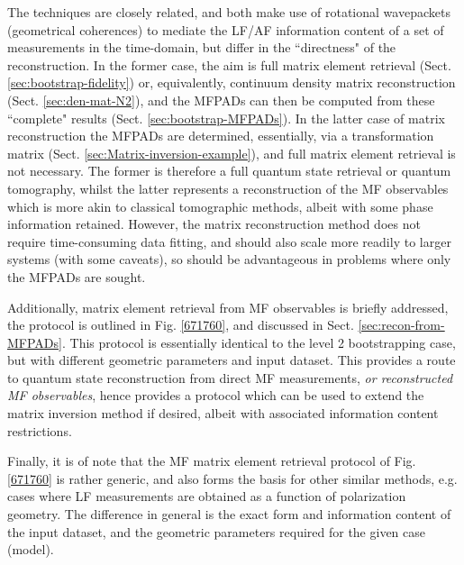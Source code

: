 \documentclass[10pt]{article}
\begin{document}
The techniques are closely related, and both make use of rotational wavepackets (geometrical coherences) to mediate the LF/AF information content of a set of measurements in the time-domain, but differ in the ``directness" of the reconstruction. In the former case, the aim is full matrix element retrieval (Sect. \ref{sec:bootstrap-fidelity}) or, equivalently, continuum density matrix reconstruction (Sect. \ref{sec:den-mat-N2}), and the MFPADs can then be computed from these ``complete" results (Sect. \ref{sec:bootstrap-MFPADs}). In the latter case of matrix reconstruction the MFPADs are determined, essentially, via a transformation matrix (Sect. \ref{sec:Matrix-inversion-example}), and full matrix element retrieval is not necessary. The former is therefore a full quantum state retrieval or quantum tomography, whilst the latter represents a reconstruction of the MF observables which is more akin to classical tomographic methods, albeit with some phase information retained. %
However, the matrix reconstruction method does not require time-consuming data fitting, and should also scale more readily to larger systems (with some caveats), so should be advantageous in problems where only the MFPADs are sought.

Additionally, matrix element retrieval from MF observables is briefly addressed, the protocol is outlined in Fig. \ref{671760}, and discussed in Sect. \ref{sec:recon-from-MFPADs}. This protocol is essentially identical to the level 2 bootstrapping case, but with different geometric parameters and input dataset. This provides a route to quantum state reconstruction from direct MF measurements, \textit{or reconstructed MF observables}, hence provides a protocol which can be used to extend the matrix inversion method if desired, albeit with associated information content restrictions.

Finally, it is of note that the MF matrix element retrieval protocol of Fig. \ref{671760} is rather generic, and also forms the basis for other similar methods, e.g. cases where LF measurements are obtained as a function of polarization geometry. The difference in general is the exact form and information content of the input dataset, and the geometric parameters required for the given case (model).
\end{document}
